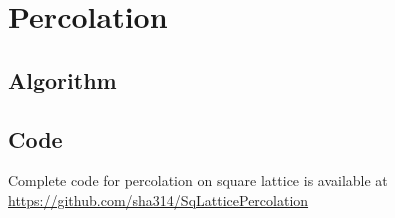 \chapter{Percolation} 
\section{Algorithm}
\section{Code}
Complete code for percolation on square lattice is available at
\url{https://github.com/sha314/SqLatticePercolation}




